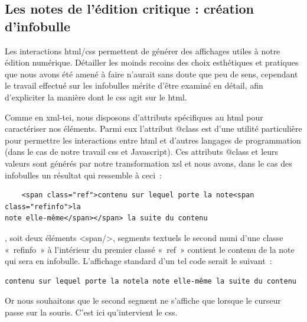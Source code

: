 \documentclass[12pt, a4paper]{article}
\begin{document}
\subsection{Les notes de l'édition critique : création d'infobulle}

\label{htmlCssInfo}


Les interactions html/css permettent de générer des affichages utiles à notre édition numérique. Détailler les moinds recoins des choix esthétiques et pratiques que nous avons été amené à faire n'aurait sans doute que peu de sens, cependant le travail effectué sur les infobulles mérite d'être examiné en détail, afin d'expliciter la manière dont le css agit sur le html.


Comme en xml-tei, nous disposons d'attributs spécifiques au html pour caractériser nos éléments. Parmi eux l'attribut @class est d'une utilité particulière pour permettre les interactions entre html et d'autres langages de programmation (dans le cas de notre travail css et Javascript). Ces attributs @class et leurs valeurs sont générés par notre transformation xsl et nous avons, dans le cas des infobulles un résultat qui ressemble à ceci~:

\begin{verbatim}
    <span class="ref">contenu sur lequel porte la note<span class="refinfo">la
note elle-même</span></span> la suite du contenu
\end{verbatim}
, soit deux éléments <span/>, segments textuels le second muni d'une classe «~refinfo~» à l'intérieur du premier classé «~ref~» contient le contenu de la note qui sera en infobulle. L'affichage standard d'un tel code serait le suivant~:
\begin{verbatim}contenu sur lequel porte la notela note elle-même la suite du contenu\end{verbatim}
Or nous souhaitons que le second segment ne s'affiche que lorsque le curseur passe sur la souris. C'est ici qu'intervient le css.
\end{document}
